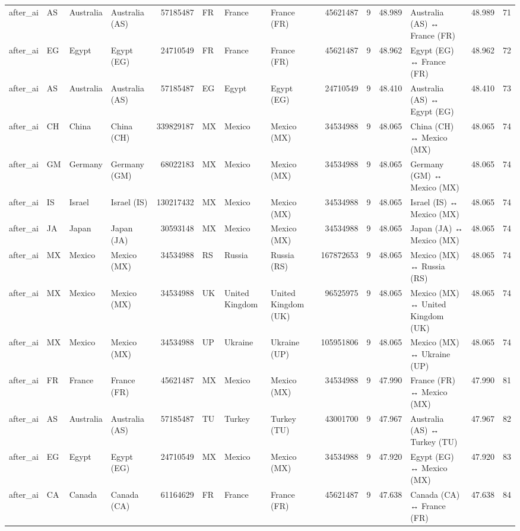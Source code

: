 \begin{tabular}{llllrlllrrrlrr}
after\_ai & AS & Australia & Australia (AS) & 57185487 & FR & France & France (FR) & 45621487 & 9 & 48.989 & Australia (AS) ↔ France (FR) & 48.989 & 71 \\
after\_ai & EG & Egypt & Egypt (EG) & 24710549 & FR & France & France (FR) & 45621487 & 9 & 48.962 & Egypt (EG) ↔ France (FR) & 48.962 & 72 \\
after\_ai & AS & Australia & Australia (AS) & 57185487 & EG & Egypt & Egypt (EG) & 24710549 & 9 & 48.410 & Australia (AS) ↔ Egypt (EG) & 48.410 & 73 \\
after\_ai & CH & China & China (CH) & 339829187 & MX & Mexico & Mexico (MX) & 34534988 & 9 & 48.065 & China (CH) ↔ Mexico (MX) & 48.065 & 74 \\
after\_ai & GM & Germany & Germany (GM) & 68022183 & MX & Mexico & Mexico (MX) & 34534988 & 9 & 48.065 & Germany (GM) ↔ Mexico (MX) & 48.065 & 74 \\
after\_ai & IS & Israel & Israel (IS) & 130217432 & MX & Mexico & Mexico (MX) & 34534988 & 9 & 48.065 & Israel (IS) ↔ Mexico (MX) & 48.065 & 74 \\
after\_ai & JA & Japan & Japan (JA) & 30593148 & MX & Mexico & Mexico (MX) & 34534988 & 9 & 48.065 & Japan (JA) ↔ Mexico (MX) & 48.065 & 74 \\
after\_ai & MX & Mexico & Mexico (MX) & 34534988 & RS & Russia & Russia (RS) & 167872653 & 9 & 48.065 & Mexico (MX) ↔ Russia (RS) & 48.065 & 74 \\
after\_ai & MX & Mexico & Mexico (MX) & 34534988 & UK & United Kingdom & United Kingdom (UK) & 96525975 & 9 & 48.065 & Mexico (MX) ↔ United Kingdom (UK) & 48.065 & 74 \\
after\_ai & MX & Mexico & Mexico (MX) & 34534988 & UP & Ukraine & Ukraine (UP) & 105951806 & 9 & 48.065 & Mexico (MX) ↔ Ukraine (UP) & 48.065 & 74 \\
after\_ai & FR & France & France (FR) & 45621487 & MX & Mexico & Mexico (MX) & 34534988 & 9 & 47.990 & France (FR) ↔ Mexico (MX) & 47.990 & 81 \\
after\_ai & AS & Australia & Australia (AS) & 57185487 & TU & Turkey & Turkey (TU) & 43001700 & 9 & 47.967 & Australia (AS) ↔ Turkey (TU) & 47.967 & 82 \\
after\_ai & EG & Egypt & Egypt (EG) & 24710549 & MX & Mexico & Mexico (MX) & 34534988 & 9 & 47.920 & Egypt (EG) ↔ Mexico (MX) & 47.920 & 83 \\
after\_ai & CA & Canada & Canada (CA) & 61164629 & FR & France & France (FR) & 45621487 & 9 & 47.638 & Canada (CA) ↔ France (FR) & 47.638 & 84 \\

\end{tabular}
